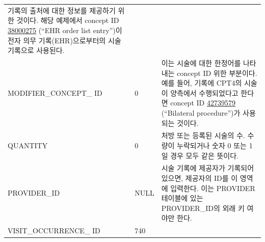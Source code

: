 \documentclass[10.5pt]{book}
\theoremstyle{definition}
\theoremstyle{definition}
\theoremstyle{definition}
\theoremstyle{remark}
\begin{document}
\begin{longtable}[]{@{}lll@{}}
\begin{minipage}[t]{0.48\columnwidth}
기록의 출처에 대한 정보를 제공하기 위한 것이다. 해당 예제에서 concept ID
\href{http://athena.ohdsi.org/search-terms/terms/38000275}{38000275}
(``EHR order list entry'')이 전자 의무 기록(EHR)으로부터의 시술 기록으로
사용된다.\strut
\end{minipage}\tabularnewline
\begin{minipage}[t]{0.28\columnwidth}\raggedright\strut
MODIFIER\_CONCEPT\_ ID\strut
\end{minipage} & \begin{minipage}[t]{0.16\columnwidth}\raggedright\strut
0\strut
\end{minipage} & \begin{minipage}[t]{0.48\columnwidth}\raggedright\strut
이는 시술에 대한 한정어를 나타내는 concept ID 위한 부분이다. 예를 들어,
기록에 CPT4의 시술이 양측에서 수행되었다고 한다면 concept ID
\href{http://athena.ohdsi.org/search-terms/terms/42739579}{42739579}
(``Bilateral procedure'')가 사용되는 것이다.\strut
\end{minipage}\tabularnewline
\begin{minipage}[t]{0.28\columnwidth}\raggedright\strut
QUANTITY\strut
\end{minipage} & \begin{minipage}[t]{0.16\columnwidth}\raggedright\strut
0\strut
\end{minipage} & \begin{minipage}[t]{0.48\columnwidth}\raggedright\strut
처방 또는 등록된 시술의 수. 수량이 누락되거나 숫자 0 또는 1일 경우 모두
같은 뜻이다.\strut
\end{minipage}\tabularnewline
\begin{minipage}[t]{0.28\columnwidth}\raggedright\strut
PROVIDER\_ID\strut
\end{minipage} & \begin{minipage}[t]{0.16\columnwidth}\raggedright\strut
NULL\strut
\end{minipage} & \begin{minipage}[t]{0.48\columnwidth}\raggedright\strut
시술 기록에 제공자가 기록되어 있으면, 제공자의 ID를 이 영역에 입력한다.
이는 PROVIDER 테이블에 있는 PROVIDER\_ID의 외래 키 여야만 한다.\strut
\end{minipage}\tabularnewline
\begin{minipage}[t]{0.28\columnwidth}\raggedright\strut
VISIT\_OCCURRENCE\_ ID\strut
\end{minipage} & \begin{minipage}[t]{0.16\columnwidth}\raggedright\strut
740\strut
\end{minipage} & \begin{minipage}[t]{0.48\columnwidth}\raggedright\strut

\end{minipage}
\end{longtable}
\end{document}
